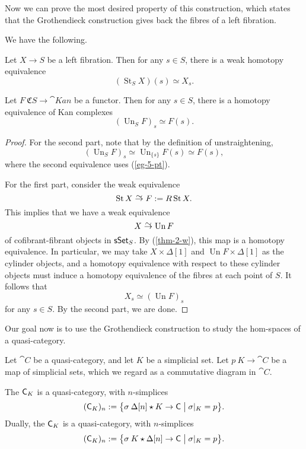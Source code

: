 Now we can prove the most desired property of this construction,
which states that the Grothendieck construction 
gives back the fibres of a left fibration.

\begin{proposition}\label{thm-5-s}
    We have the following.
    \begin{itms}
        \item Let $X\to S$ be a left fibration.
        Then for any $s\in S$, there is a weak homotopy equivalence
        \[ (\operatorname{St}_SX)(s)\simeq X_s. \]
        \item Let $F\:\mathfrak CS\to\cat{Kan}$ be a functor.
        Then for any $s\in S$, there is a homotopy equivalence of Kan complexes
        \[ (\operatorname{Un}_SF)_s\simeq F(s). \]
    \end{itms}
\end{proposition}

\begin{proof}
    For the second part, note that by the definition of unstraightening,
    \[ (\operatorname{Un}_SF)_s \simeq \operatorname{Un}_{\{s\}}F(s) \simeq F(s), \]
    where the second equivalence uses (\ref{eg-5-pt}).

    For the first part, consider the weak equivalence
    \[ \operatorname{St} X \simto F := R\operatorname{St}X. \]
    This implies that we have a weak equivalence
    \[ X \simto \operatorname{Un} F \]
    of cofibrant-fibrant objects in $\mathsf{sSet}_{\/S}$.
    By (\ref{thm-2-w}), this map is a homotopy equivalence.
    In particular, we may take $X \times \Delta[1]$ and $\operatorname{Un} F \times \Delta[1]$
    as the cylinder objects,
    and a homotopy equivalence with respect to these cylinder objects
    must induce a homotopy equivalence of the fibres at each point of $S$.
    It follows that
    \[ X_s \simeq (\operatorname{Un}F)_s \]
    for any $s\in S$. By the second part, we are done.
\end{proof}

Our goal now is to use the Grothendieck construction 
to study the hom-spaces of a quasi-category.

Let $\cat C$ be a quasi-category, and let $K$ be a simplicial set.
Let $p\:K\to\cat C$ be a map of simplicial sets,
which we regard as a commutative diagram in $\cat C$.

\begin{definition}
    The  $\mathsf{C}_{\/K}$ is a quasi-category,
    with $n$-simplices
    \[ (\mathsf{C}_{\/K})_n:=\bigl\{\sigma\:\Delta[n]\star K\to\mathsf{C}\mathrel{\big|}\sigma|_K=p\bigr\}. \]
    Dually, the  $\mathsf{C}_{K\/}$ is a quasi-category,
    with $n$-simplices
    \[ (\mathsf{C}_{K\/})_n:=\bigl\{\sigma\:K\star\Delta[n]\to\mathsf{C}\mathrel{\big|}\sigma|_K=p\bigr\}. \]
\end{definition}

